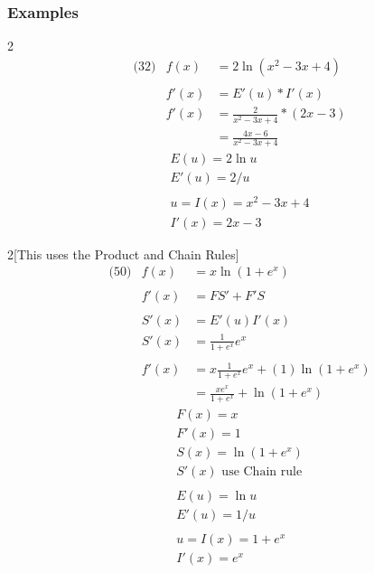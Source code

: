 \documentclass[14pt]{extarticle}
\begin{document}
\subsubsection{Examples}
\begin{multicols}{2}
	\begin{align*}
		&\text{(32)} &f(x) &= 2 \ln(x^2 - 3x + 4) \\\\
		&			&f'(x) &= E'(u)*I'(x) \\
		&			&f'(x)	&= \frac{2}{x^2-3x+4}*(2x-3) \\
		&	&		&= \frac{4x-6}{x^2-3x+4}
	\end{align*}
	\vfill\null
	\columnbreak
	\begin{align*}
		&E(u) = 2\ln u \\
		&E'(u) = 2/u \\\\
		&u = I(x)=x^2 - 3x + 4 \\
		& I'(x) = 2x-3
	\end{align*}
	\vfill\null
\end{multicols}

\begin{multicols}{2}[This uses the Product and Chain Rules]
	\begin{align*}
		&\text{(50)} &f(x) &= x \ln(1+e^x) \\\\
		&			&f'(x) &= FS'+ F'S \\\\
		&			&S'(x) &= E'(u)I'(x) \\
		&			&S'(x) &= \frac{1}{1+e^x}e^x \\\\		
		&			&f'(x) &= x\frac{1}{1+e^x}e^x +  (1)\ln(1+e^x)\\
		&			&    &= \frac{xe^x}{1+e^x} + \ln(1+e^x)
	\end{align*}
	\vfill\null
	\columnbreak
	\begin{align*}
		&F(x) = x \\
		&F'(x) = 1 \\
		&S(x) = \ln(1+e^x) \\
		&S'(x) \text{ use Chain rule} \\\\
		&E(u) = \ln u \\
		&E'(u) = 1/u \\\\
		&u = I(x)= 1+e^x \\
		& I'(x) = e^x
	\end{align*}
	\vfill\null
\end{multicols}
\end{document}
